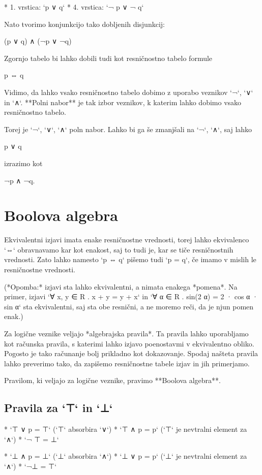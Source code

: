 * 1. vrstica: `p ∨ q`
* 4. vrstica: `¬ p ∨ ¬ q`

Nato tvorimo konjunkcijo tako dobljenih disjunkcij:

    (p ∨ q) ∧ (¬p ∨ ¬q)

Zgornjo tabelo bi lahko dobili tudi kot resničnostno tabelo formule

    p ⇔ q

Vidimo, da lahko vsako resničnostno tabelo dobimo z uporabo veznikov `¬`, `∨` in
`∧`. **Polni nabor** je tak izbor veznikov, k katerim lahko dobimo vsako
resničnostno tabelo.

Torej je `¬`, `∨`, `∧` poln nabor. Lahko bi ga še zmanjšali na `¬`, `∧`, saj lahko

    p ∨ q

izrazimo kot

    ¬p ∧ ¬q.

\section{Boolova algebra}

Ekvivalentni izjavi imata enake resničnostne vrednosti, torej lahko ekvivalenco
`⇔` obravnavamo kar kot enakost, saj to tudi je, kar se tiče resničnostnih
vrednosti. Zato lahko namesto `p ⇔ q` pišemo tudi `p = q`, če imamo v mislih le
resničnostne vrednosti.

(*Opomba:* izjavi sta lahko ekvivalentni, a nimata enakega *pomena*. Na primer,
izjavi `∀ x, y ∈ R . x + y = y + x` in `∀ α ∈ R . sin(2 α) = 2 · cos α · sin α`
sta ekvivalentni, saj sta obe resnični, a ne moremo reči, da je njun pomen enak.)

Za logične veznike veljajo *algebrajska pravila*. Ta pravila lahko uporabljamo
kot računska pravila, s katerimi lahko izjavo poenostavmi v ekvivalentno obliko.
Pogosto je tako računanje bolj prikladno kot dokazovanje. Spodaj našteta pravila
lahko preverimo tako, da zapišemo resničnostne tabele izjav in jih primerjamo.

Pravilom, ki veljajo za logične veznike, pravimo **Boolova algebra**.

\subsection{Pravila za `⊤` in `⊥`}

* `⊤ ∨ p = ⊤` (`⊤` absorbira `∨`)
* `⊤ ∧ p = p` (`⊤` je nevtralni element za `∧`)
* `¬ ⊤  = ⊥`

* `⊥ ∧ p = ⊥` (`⊥` absorbira `∧`)
* `⊥ ∨ p = p` (`⊥` je nevtralni element za `∧`)
* `¬⊥ = ⊤`

